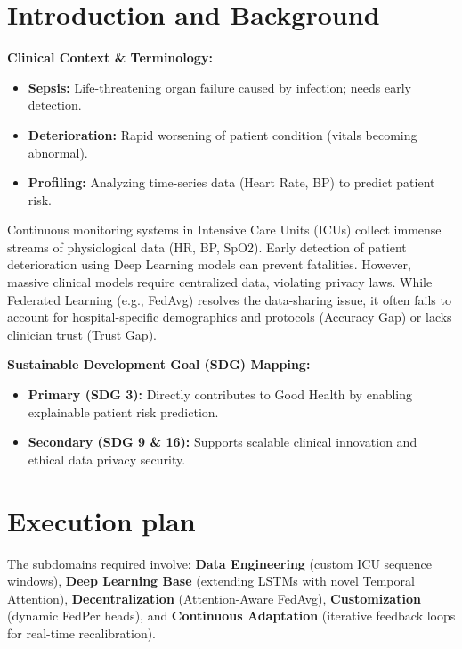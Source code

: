 \documentclass[11pt, a4paper]{article}
\begin{document}
\section{Introduction and Background}
\textbf{Clinical Context \& Terminology:}
\begin{itemize}[noitemsep, leftmargin=1.5em]
    \item \textbf{Sepsis:} Life-threatening organ failure caused by infection; needs early detection.
    \item \textbf{Deterioration:} Rapid worsening of patient condition (vitals becoming abnormal).
    \item \textbf{Profiling:} Analyzing time-series data (Heart Rate, BP) to predict patient risk.
\end{itemize}

Continuous monitoring systems in Intensive Care Units (ICUs) collect immense streams of physiological data (HR, BP, SpO2). Early detection of patient deterioration using Deep Learning models can prevent fatalities. However, massive clinical models require centralized data, violating privacy laws. While Federated Learning (e.g., FedAvg) resolves the data-sharing issue, it often fails to account for hospital-specific demographics and protocols (Accuracy Gap) or lacks clinician trust (Trust Gap).

\vspace{0.2cm}
\textbf{Sustainable Development Goal (SDG) Mapping:}
\begin{itemize}[noitemsep, leftmargin=1.5em]
    \item \textbf{Primary (SDG 3):} Directly contributes to Good Health by enabling explainable patient risk prediction.
    \item \textbf{Secondary (SDG 9 \& 16):} Supports scalable clinical innovation and ethical data privacy security.
\end{itemize}

\section{Execution plan}
The subdomains required involve: \textbf{Data Engineering} (custom ICU sequence windows), \textbf{Deep Learning Base} (extending LSTMs with novel Temporal Attention), \textbf{Decentralization} (Attention-Aware FedAvg), \textbf{Customization} (dynamic FedPer heads), and \textbf{Continuous Adaptation} (iterative feedback loops for real-time recalibration).
\end{document}
